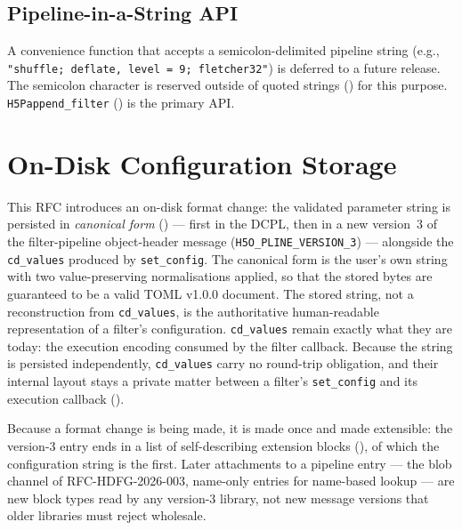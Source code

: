 \documentclass[../RFC-HDFG-2026-001.tex]{subfiles}
\begin{document}
\subsection{Pipeline-in-a-String API}
\label{sec:pipeline-string}

A convenience function that accepts a semicolon-delimited pipeline string
(e.g., \texttt{"shuffle; deflate, level = 9; fletcher32"}) is deferred to a
future release.  The semicolon character is reserved outside of quoted strings
() for this purpose.
\texttt{H5Pappend\_filter} () is the primary API.


\section{On-Disk Configuration Storage}
\label{sec:pline-v3}

This RFC introduces an on-disk format change: the validated parameter
string is persisted in \emph{canonical form}
() --- first in the DCPL, then in a
new version~3 of the filter-pipeline object-header message
(\texttt{H5O\_PLINE\_VERSION\_3}) --- alongside the \texttt{cd\_values}
produced by \texttt{set\_config}.  The canonical form is the user's own
string with two value-preserving normalisations applied, so that the stored
bytes are guaranteed to be a valid TOML v1.0.0 document.  The stored
string, not a reconstruction from \texttt{cd\_values}, is the authoritative
human-readable representation of a filter's configuration.  \texttt{cd\_values} remain
exactly what they are today: the execution encoding consumed by the
filter callback.  Because the string is persisted independently,
\texttt{cd\_values} carry no round-trip obligation, and their internal
layout stays a private matter between a filter's \texttt{set\_config}
and its execution callback ().

Because a format change is being made, it is made once and made
extensible: the version-3 entry ends in a list of self-describing
extension blocks (), of which the
configuration string is the first.  Later attachments to a pipeline entry
--- the blob channel of RFC-HDFG-2026-003, name-only entries for
name-based lookup --- are new block types read by any version-3 library,
not new message versions that older libraries must reject wholesale.
\end{document}
